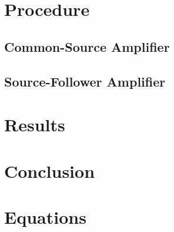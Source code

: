 \section{Procedure}
\label{sec:procedure}

\subsection{Common-Source Amplifier}
\label{sec:inverter}


\subsection{Source-Follower Amplifier}
\label{sec:smallsig}


\section{Results}
\label{sec:results}




\section{Conclusion}
\label{sec:conclusion}


\section{Equations}
\label{sec:equations}

